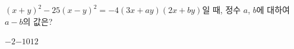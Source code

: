 $(x+y)^2-25(x-y)^2=-4(3x+ay)(2x+by)$일 때, 정수 $a$, $b$에 대하여 $a-b$의 값은?
\begin{choices32}{$-2$}{$-1$}{$0$}{$1$}{$2$}\end{choices32}
